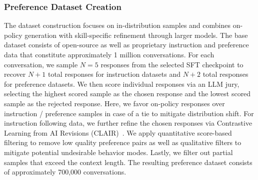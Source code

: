 \documentclass{article}
\begin{document}
\subsubsection{Preference Dataset Creation}
\label{sec:preference_data}
The dataset construction focuses on in-distribution samples and combines on-policy generation with skill-specific refinement through larger models. The base dataset consists of open-source as well as proprietary instruction and preference data that constitute approximately 1 million conversations. For each conversation, we sample $N=5$ responses from the selected SFT checkpoint to recover $N+1$ total responses for instruction datasets and $N+2$ total responses for preference datasets. We then score individual responses via an LLM jury, selecting the highest scored sample as the chosen response and the lowest scored sample as the rejected response. Here, we favor on-policy responses over instruction / preference samples in case of a tie to mitigate distribution shift. For instruction following data, we further refine the chosen responses via Contrastive
Learning from AI Revisions (CLAIR)~\citep{d2025anchored}. We apply quantitative score-based filtering to remove low quality preference pairs as well as qualitative filters to mitigate potential undesirable behavior modes. Lastly, we filter out partial samples that exceed the context length. The resulting preference dataset consists of approximately 700,000 conversations.
\end{document}
